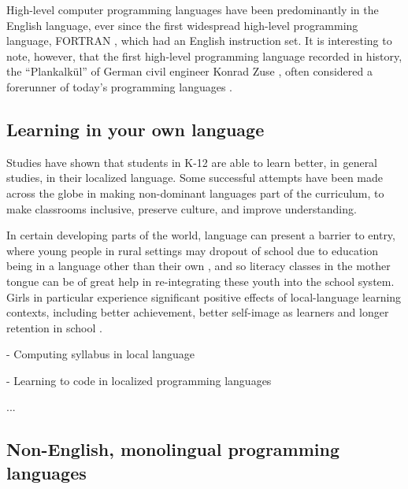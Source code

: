 \documentclass[conference]{IEEEtran}
\begin{document}
High-level computer programming languages have been predominantly in the English language, ever since the first widespread high-level programming language, FORTRAN \cite{backus1978history}, which had an English instruction set. It is interesting to note, however, that the first high-level programming language recorded in history, the “Plankalkül” of German civil engineer Konrad Zuse \cite{zuse1963ansaetze}, often considered a forerunner of today's programming languages \cite{bauer1972plankalkul}.

\subsection{Learning in your own language}

Studies have shown that students in K-12 are able to learn better, in general studies, in their localized language. \cite{buhmann2008mother} Some successful attempts have been made across the globe in making non-dominant languages part of the curriculum, to make classrooms inclusive, preserve culture, and improve understanding. \cite{taylor2015finding}

In certain developing parts of the world, language can present a barrier to entry, where young people in rural settings may dropout of school due to education being in a language other than their own \cite{trudell2009local}, and so literacy classes in the mother tongue can be of great help in re-integrating these youth into the school
system. Girls in particular experience significant positive effects of
local-language learning contexts, including better achievement,
better self-image as learners and longer retention in school
\cite{unescobangkok2005mothertongue}.

  - Computing syllabus in local language \cite{10.1145/3304221.3319778}

  - Learning to code in localized programming languages \cite{dasgupta2017learning}

  ...

\subsection{Non-English, monolingual programming languages}


\end{document}
